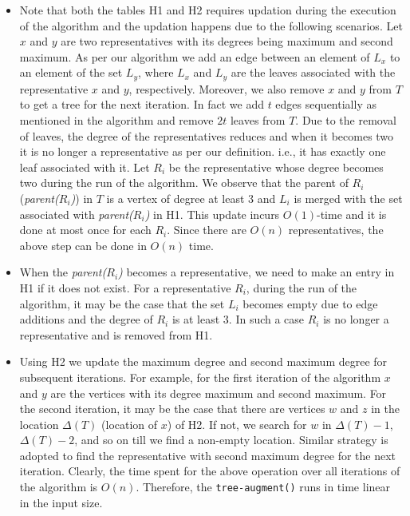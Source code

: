 \documentclass[runningheads]{llncs}
\begin{document}
\begin{itemize}
\item Note that both the tables H1 and H2 requires updation during the execution of the algorithm and the updation happens due to the following scenarios.  Let $x$ and $y$ are two representatives with its degrees being maximum and second maximum.  As per our algorithm we add an edge between an element of $L_x$ to an element of the set $L_y$, where $L_x$ and $L_y$ are the leaves associated with the representative $x$ and $y$, respectively.  Moreover, we also remove $x$ and $y$ from $T$ to get a tree for the next iteration.  In fact we add $t$ edges sequentially as mentioned in the algorithm and remove $2t$ leaves from $T$.  Due to the removal of leaves, the degree of the representatives reduces and when it becomes two it is no longer a representative as per our definition.  i.e., it has exactly one leaf associated with it.  Let $R_i$ be the representative whose degree becomes two during the run of the algorithm.  We observe that the parent of $R_i$ ({\em parent($R_i$)}) in $T$ is a vertex of degree at least 3 and $L_i$ is merged with the set associated with {\em parent($R_i$)} in H1.  This update incurs $O(1)$-time and it is done at most once for each $R_i$.  Since there are $O(n)$ representatives, the above step can be done in $O(n)$ time.
\item When the {\em parent($R_i$)} becomes a representative, we need to make an entry in H1 if it does not exist.  For a representative $R_i$, during the run of the algorithm, it may be the case that the set $L_i$ becomes empty due to edge additions and the degree of $R_i$ is at least 3.  In such a case $R_i$ is no longer a representative and is removed from H1.  
\item Using H2 we update the maximum degree and second maximum degree for subsequent iterations.  For example, for the first iteration of the algorithm $x$ and $y$ are the vertices with its degree maximum and second maximum.  For the second iteration, it may be the case that there are vertices $w$ and $z$ in the location $\Delta(T)$ (location of $x$) of H2.  If not, we search for $w$ in $\Delta(T)-1$, $\Delta(T)-2$, and so on till we find a non-empty location.  Similar strategy is adopted to find the representative with second maximum degree for the next iteration.  Clearly, the time spent for the above operation over all iterations of the algorithm  is $O(n)$.  Therefore, the {\tt tree-augment()} runs in time linear in the input size.
\end{itemize}
\end{document}
